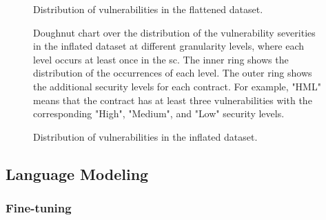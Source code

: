\begin{figure}[htbp]
    \centering
    
    \caption{Distribution of vulnerabilities in the flattened dataset.}
\end{figure}



\begin{figure}[htbp]
    \centering
    
    \caption{Doughnut chart over the distribution of the vulnerability severities in the inflated dataset at different granularity levels, where each level occurs at least once in the \acrshort{sc}. The inner ring shows the distribution of the occurrences of each level. The outer ring shows the additional security levels for each contract. For example, "HML" means that the contract has at least three vulnerabilities with the corresponding "High", "Medium", and "Low" security levels.}
\end{figure}


\begin{figure}[htbp]
    \centering
    
    \caption{Distribution of vulnerabilities in the inflated dataset.}
\end{figure}

\subsection{Language Modeling}
\label{sec:language-modeling}

\subsubsection{Fine-tuning}
\label{sec:fine-tuning}

